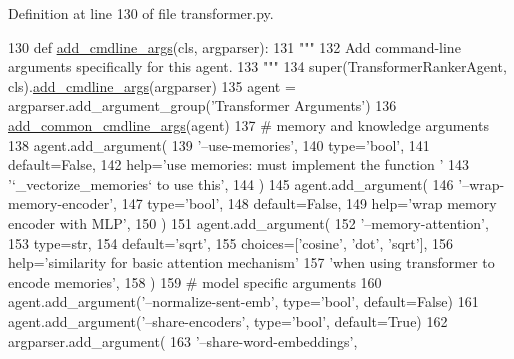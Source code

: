 Definition at line 130 of file transformer.\+py.


\begin{DoxyCode}
130     \textcolor{keyword}{def }\hyperlink{namespaceparlai_1_1agents_1_1drqa_1_1config_a62fdd5554f1da6be0cba185271058320}{add\_cmdline\_args}(cls, argparser):
131         \textcolor{stringliteral}{"""}
132 \textcolor{stringliteral}{        Add command-line arguments specifically for this agent.}
133 \textcolor{stringliteral}{        """}
134         super(TransformerRankerAgent, cls).\hyperlink{namespaceparlai_1_1agents_1_1drqa_1_1config_a62fdd5554f1da6be0cba185271058320}{add\_cmdline\_args}(argparser)
135         agent = argparser.add\_argument\_group(\textcolor{stringliteral}{'Transformer Arguments'})
136         \hyperlink{namespaceparlai_1_1agents_1_1transformer_1_1transformer_a916bc49d43dc0e244d24c47956c621ca}{add\_common\_cmdline\_args}(agent)
137         \textcolor{comment}{# memory and knowledge arguments}
138         agent.add\_argument(
139             \textcolor{stringliteral}{'--use-memories'},
140             type=\textcolor{stringliteral}{'bool'},
141             default=\textcolor{keyword}{False},
142             help=\textcolor{stringliteral}{'use memories: must implement the function '}
143             \textcolor{stringliteral}{'`\_vectorize\_memories` to use this'},
144         )
145         agent.add\_argument(
146             \textcolor{stringliteral}{'--wrap-memory-encoder'},
147             type=\textcolor{stringliteral}{'bool'},
148             default=\textcolor{keyword}{False},
149             help=\textcolor{stringliteral}{'wrap memory encoder with MLP'},
150         )
151         agent.add\_argument(
152             \textcolor{stringliteral}{'--memory-attention'},
153             type=str,
154             default=\textcolor{stringliteral}{'sqrt'},
155             choices=[\textcolor{stringliteral}{'cosine'}, \textcolor{stringliteral}{'dot'}, \textcolor{stringliteral}{'sqrt'}],
156             help=\textcolor{stringliteral}{'similarity for basic attention mechanism'}
157             \textcolor{stringliteral}{'when using transformer to encode memories'},
158         )
159         \textcolor{comment}{# model specific arguments}
160         agent.add\_argument(\textcolor{stringliteral}{'--normalize-sent-emb'}, type=\textcolor{stringliteral}{'bool'}, default=\textcolor{keyword}{False})
161         agent.add\_argument(\textcolor{stringliteral}{'--share-encoders'}, type=\textcolor{stringliteral}{'bool'}, default=\textcolor{keyword}{True})
162         argparser.add\_argument(
163             \textcolor{stringliteral}{'--share-word-embeddings'},

\end{DoxyCode}

